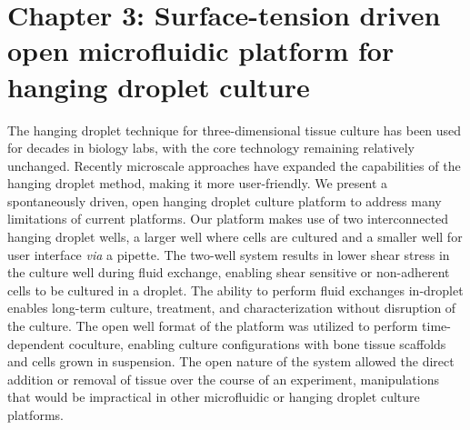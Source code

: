 \chapter{Chapter 3: Surface-tension driven open microfluidic platform for hanging droplet culture}\label{Chap:HangingDroplet}

The hanging droplet technique for three-dimensional tissue culture has been used for decades in biology labs, with the core technology remaining relatively unchanged. Recently microscale approaches have expanded the capabilities of the hanging droplet method, making it more user-friendly. We present a spontaneously driven, open hanging droplet culture platform to address many limitations of current platforms. Our platform makes use of two interconnected hanging droplet wells, a larger well where cells are cultured and a smaller well for user interface \textit{via} a pipette. The two-well system results in lower shear stress in the culture well during fluid exchange, enabling shear sensitive or non-adherent cells to be cultured in a droplet. The ability to perform fluid exchanges in-droplet enables long-term culture, treatment, and characterization without disruption of the culture. The open well format of the platform was utilized to perform time-dependent coculture, enabling culture configurations with bone tissue scaffolds and cells grown in suspension. The open nature of the system allowed the direct addition or removal of tissue over the course of an experiment, manipulations that would be impractical in other microfluidic or hanging droplet culture platforms. 


